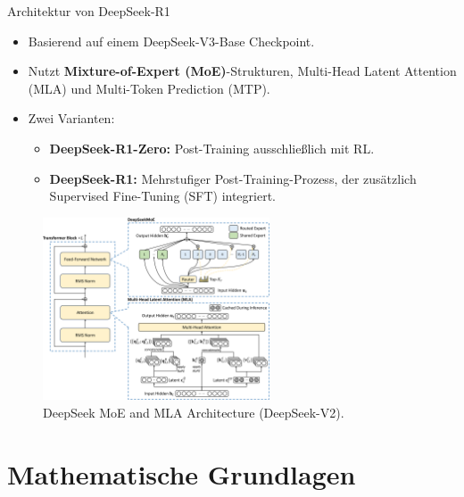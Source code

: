 \documentclass[aspectratio=1610, xcolor=dvipsnames, 9pt]{beamer}
\begin{document}
\begin{frame}{Architektur von DeepSeek-R1}
  \begin{itemize}
    \item Basierend auf einem DeepSeek-V3-Base Checkpoint.
    \item Nutzt \textbf{Mixture-of-Expert (MoE)}-Strukturen, Multi-Head Latent Attention (MLA) und Multi-Token Prediction (MTP).
    \item Zwei Varianten:
    \begin{itemize}
        \item \textbf{DeepSeek-R1-Zero:} Post-Training ausschließlich mit RL.
        \item \textbf{DeepSeek-R1:} Mehrstufiger Post-Training-Prozess, der zusätzlich Supervised Fine-Tuning (SFT) integriert.
    \end{itemize}
    \end{itemize}
    \begin{center}
      \begin{figure}
        \centering
        \includegraphics[width=0.6\textwidth]{images/DeepSeek_MoE_and_MLA_(DeepSeek-V2).png}
        \caption{DeepSeek MoE and MLA Architecture (DeepSeek-V2).}
      \end{figure}
    \end{center}
\end{frame}

\section{Mathematische Grundlagen}
\end{document}
